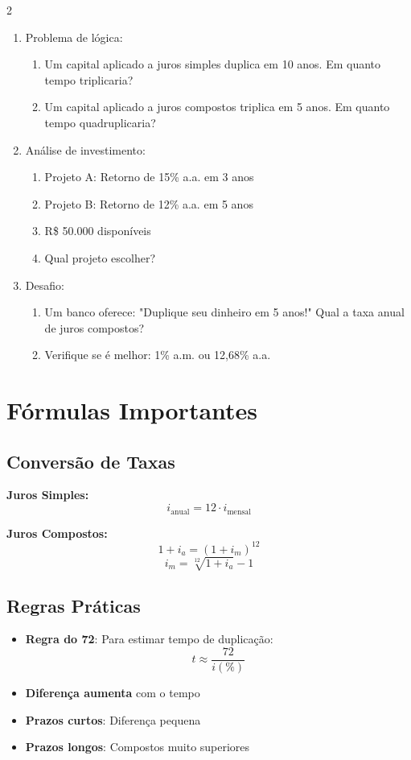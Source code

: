 \documentclass[11pt]{article}
\begin{document}
\begin{multicols}{2}
\begin{enumerate}[leftmargin=*, start=16]
\item Problema de lógica:
\begin{enumerate}[label=\alph*)]
\item Um capital aplicado a juros simples duplica em 10 anos.
  Em quanto tempo triplicaria?
\item Um capital aplicado a juros compostos triplica em 5 anos.
  Em quanto tempo quadruplicaria?
\end{enumerate}

\item Análise de investimento:
\begin{enumerate}[label=\alph*)]
\item Projeto A: Retorno de 15\% a.a. em 3 anos
\item Projeto B: Retorno de 12\% a.a. em 5 anos
\item R\$ 50.000 disponíveis
\item Qual projeto escolher?
\end{enumerate}

\item Desafio:
\begin{enumerate}[label=\alph*)]
\item Um banco oferece: "Duplique seu dinheiro em 5 anos!"
  Qual a taxa anual de juros compostos?
\item Verifique se é melhor: 1\% a.m. ou 12,68\% a.a.
\end{enumerate}

\end{enumerate}

\section*{Fórmulas Importantes}

\subsection*{Conversão de Taxas}

\textbf{Juros Simples:}
\[
i_{\text{anual}} = 12 \cdot i_{\text{mensal}}
\]

\textbf{Juros Compostos:}
\[
1 + i_a = (1 + i_m)^{12}
\]
\[
i_m = \sqrt[12]{1 + i_a} - 1
\]

\subsection*{Regras Práticas}

\begin{itemize}
\item \textbf{Regra do 72}: Para estimar tempo de duplicação:
  \[
  t \approx \frac{72}{i(\%)}
  \]
\item \textbf{Diferença aumenta} com o tempo
\item \textbf{Prazos curtos}: Diferença pequena
\item \textbf{Prazos longos}: Compostos muito superiores
\end{itemize}


\end{multicols}
\end{document}
